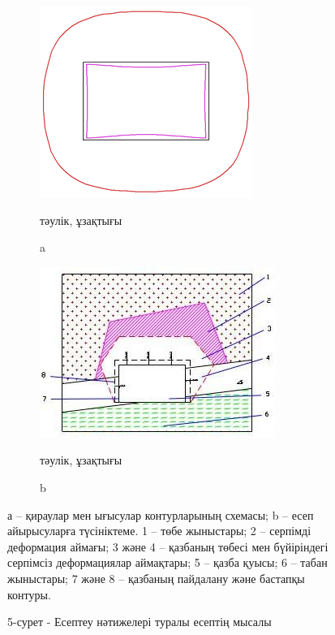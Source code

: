 \begin{figure}[H]
    \centering
    \begin{subfigure}[b]{0.45\textwidth}
        \centering
        \includegraphics[width=0.8\linewidth]{assets/1333}
		\caption*{тәулік, ұзақтығы}
		\caption*{a}
    \end{subfigure}
    \hfill
    \begin{subfigure}[b]{0.45\textwidth}
        \centering
        \includegraphics[width=\linewidth]{assets/1334}
		\caption*{тәулік, ұзақтығы}
		\caption*{b}
    \end{subfigure}
  \caption*{а -- қираулар мен ығысулар контурларының схемасы; b -- есеп
айырысуларға түсініктеме. 1 -- төбе жыныстары; 2 -- серпімді деформация аймағы; 3 және 4 --
қазбаның төбесі мен бүйіріндегі серпімсіз деформациялар аймақтары; 5 --
қазба қуысы; 6 -- табан жыныстары; 7 және 8 -- қазбаның пайдалану және
бастапқы контуры.}
  \caption*{5-сурет - Есептеу нәтижелері туралы есептің мысалы}
\end{figure}

